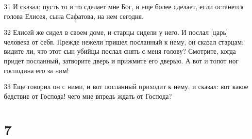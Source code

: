 \par 31 И сказал: пусть то и то сделает мне Бог, и еще более сделает, если останется голова Елисея, сына Сафатова, на нем сегодня.
\par 32 Елисей же сидел в своем доме, и старцы сидели у него. И послал [царь] человека от себя. Прежде нежели пришел посланный к нему, он сказал старцам: видите ли, что этот сын убийцы послал снять с меня голову? Смотрите, когда придет посланный, затворите дверь и прижмите его дверью. А вот и топот ног господина его за ним!
\par 33 Еще говорил он с ними, и вот посланный приходит к нему, и сказал: вот какое бедствие от Господа! чего мне впредь ждать от Господа?

\chapter{7}

